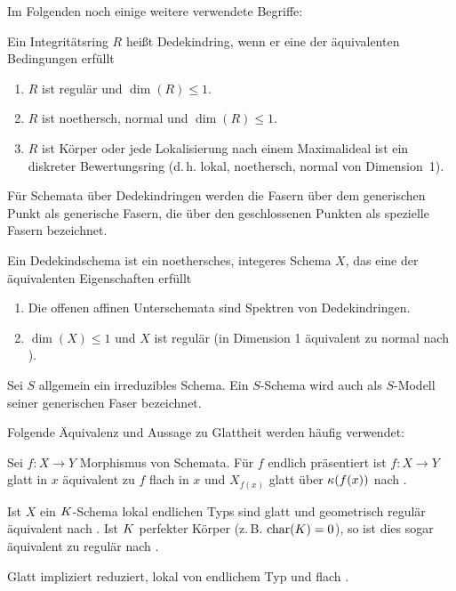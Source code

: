 Im Folgenden noch einige weitere verwendete Begriffe:

\begin{Definition}[Dedekindring]\label{def:dedekindring}
  Ein Integritätsring $R$ heißt Dedekindring, wenn er eine der
  äquivalenten Bedingungen erfüllt
  \begin{enumerate}[label=(\roman*)]
  \item $R$ ist regulär und $\dim(R)\leq 1$.
  \item $R$ ist noethersch, normal und $\dim(R)\leq 1$.
  \item $R$ ist Körper oder
    jede Lokalisierung nach einem Maximalideal ist ein diskreter
    Bewertungsring
    (d.\,h. lokal, noethersch, normal von Dimension~1).
  \end{enumerate}
\end{Definition}
Für Schemata über Dedekindringen werden die Fasern über dem
generischen Punkt als generische Fasern, die über den geschlossenen
Punkten als spezielle Fasern bezeichnet.
\begin{Definition}[Dedekindschema]
  Ein Dedekindschema ist ein noethersches, integeres Schema $X$, das
  eine der äquivalenten Eigenschaften erfüllt
  \begin{enumerate}[label=(\roman*)]
  \item Die offenen affinen Unterschemata sind Spektren von Dedekindringen.
  \item $\dim(X)\leq 1$ und $X$ ist regulär
    (in Dimension 1 äquivalent zu normal nach
    \cite[Corollary 6.39, Proposition 6.40]{wedhorn}).
  \end{enumerate}
\end{Definition}
Sei $S$ allgemein ein irreduzibles Schema. Ein $S$-Schema wird auch als
$S$-Modell seiner generischen Faser bezeichnet.

Folgende Äquivalenz und Aussage zu Glattheit werden häufig verwendet:
\begin{Bemerkung}\label{thm:eigglatt}
  Sei $f\colon X\to Y$ Morphismus von Schemata.
  Für $f$ endlich präsentiert ist $f\colon X\to Y $ glatt in $x$
  äquivalent zu $f$ flach in $x$ und $X_{f(x)}$ glatt über $\kappa(f(x))$ nach
  \cite[8.5, Proposition 17]{bosch}.
  
  Ist $X$ ein $K$-Schema lokal endlichen Typs sind glatt und
  geometrisch regulär äquivalent nach \cite[Corollary 6.32]{wedhorn}.
  Ist $K$ perfekter Körper (z.\,B. $\operatorname{char}(K)=0$), so ist dies sogar
  äquivalent zu regulär nach \cite[Remark 6.33]{wedhorn}.
    
  Glatt impliziert reduziert, lokal von endlichem Typ und flach
  \cite[für flach s.][Theorem 14.22]{wedhorn}.
\end{Bemerkung}

